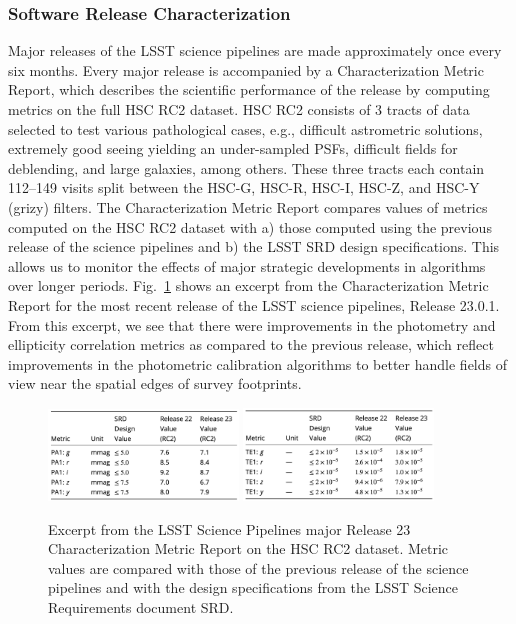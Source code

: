 \subsubsection{Software Release Characterization } \label{sssec:characterization}

Major releases of the LSST science pipelines are made approximately once every six months. 
Every major release is accompanied by a Characterization Metric Report, which describes the scientific performance of the release by computing \faro metrics on the full HSC RC2 dataset. 
HSC RC2 consists of 3 tracts of data selected to test various pathological cases, e.g., difficult astrometric solutions, extremely good seeing yielding an under-sampled PSFs, difficult fields for deblending, and large galaxies, among others.
These three tracts each contain 112--149 visits split between the HSC-G, HSC-R, HSC-I, HSC-Z, and HSC-Y (grizy) filters.
The Characterization Metric Report compares values of metrics computed on the HSC RC2 dataset with a) those computed using the previous release of the science pipelines and b) the LSST SRD design specifications. 
This allows us to monitor the effects of major strategic developments in algorithms over longer periods.
Fig.~\ref{fig:cmr_r23} shows an excerpt from the Characterization Metric Report \cite{dmtr-351} for the most recent release of the LSST science pipelines, Release 23.0.1.
From this excerpt, we see that there were improvements in the photometry and ellipticity correlation metrics as compared to the previous release, which reflect improvements in the photometric calibration algorithms to better handle fields of view near the spatial edges of survey footprints. 
\begin{figure}[ht]
  \centering
  \includegraphics[width=0.45\textwidth]{figures/cmr_r23_photometric_metrics} 
  \hspace{0.5cm}
  \includegraphics[width=0.45\textwidth]{figures/cmr_r23_ellipticity_metrics}
  \par\medskip
  \caption{\label{fig:cmr_r23}
  Excerpt from the  LSST Science Pipelines major Release 23 Characterization Metric Report on the HSC RC2 dataset. Metric values are compared with those of the previous release of the science pipelines and with the design specifications from the LSST Science Requirements document SRD.}
\end{figure}

